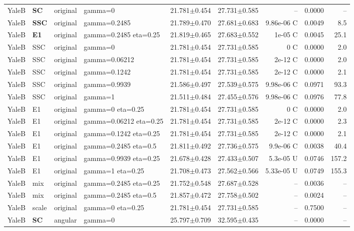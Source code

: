\begin{longtable}{lllp{.14\linewidth}rrrrr}
YaleB & \textbf{SC} & original & gamma=0 & 21.781$\pm$0.454 & 27.731$\pm$0.585 & -- & 0.0000 & --\\
YaleB & \textbf{SSC} & original & gamma=0.2485 & 21.789$\pm$0.470 & 27.681$\pm$0.683 & 9.86e-06 C & 0.0049 & 8.5\\
YaleB & \textbf{E1} & original & gamma=0.2485 eta=0.25 & 21.819$\pm$0.465 & 27.683$\pm$0.552 & 1e-05 C & 0.0045 & 25.1\\
YaleB & SSC & original & gamma=0 & 21.781$\pm$0.454 & 27.731$\pm$0.585 & 0 C & 0.0000 & 2.0\\
YaleB & SSC & original & gamma=0.06212 & 21.781$\pm$0.454 & 27.731$\pm$0.585 & 2e-12 C & 0.0000 & 2.0\\
YaleB & SSC & original & gamma=0.1242 & 21.781$\pm$0.454 & 27.731$\pm$0.585 & 2e-12 C & 0.0000 & 2.1\\
YaleB & SSC & original & gamma=0.9939 & 21.586$\pm$0.497 & 27.539$\pm$0.575 & 9.98e-06 C & 0.0971 & 93.3\\
YaleB & SSC & original & gamma=1 & 21.511$\pm$0.484 & 27.455$\pm$0.576 & 9.98e-06 C & 0.0976 & 77.8\\
YaleB & E1 & original & gamma=0 eta=0.25 & 21.781$\pm$0.454 & 27.731$\pm$0.585 & 0 C & 0.0000 & 2.0\\
YaleB & E1 & original & gamma=0.06212 eta=0.25 & 21.781$\pm$0.454 & 27.731$\pm$0.585 & 2e-12 C & 0.0000 & 2.3\\
YaleB & E1 & original & gamma=0.1242 eta=0.25 & 21.781$\pm$0.454 & 27.731$\pm$0.585 & 2e-12 C & 0.0000 & 2.1\\
YaleB & E1 & original & gamma=0.2485 eta=0.5 & 21.811$\pm$0.492 & 27.736$\pm$0.575 & 9.9e-06 C & 0.0038 & 40.4\\
YaleB & E1 & original & gamma=0.9939 eta=0.25 & 21.678$\pm$0.428 & 27.433$\pm$0.507 & 5.3e-05 U & 0.0746 & 157.2\\
YaleB & E1 & original & gamma=1 eta=0.25 & 21.708$\pm$0.473 & 27.562$\pm$0.566 & 5.33e-05 U & 0.0749 & 155.3\\
YaleB & mix & original & gamma=0.2485 eta=0.25 & 21.752$\pm$0.548 & 27.687$\pm$0.528 & -- & 0.0036 & --\\
YaleB & mix & original & gamma=0.2485 eta=0.5 & 21.857$\pm$0.472 & 27.758$\pm$0.502 & -- & 0.0024 & --\\
YaleB & scale & original & gamma=0 eta=0.25 & 21.781$\pm$0.454 & 27.731$\pm$0.585 & -- & 0.7500 & --\\
YaleB & \textbf{SC} & angular & gamma=0 & 25.797$\pm$0.709 & 32.595$\pm$0.435 & -- & 0.0000 & --\\

\end{longtable}
